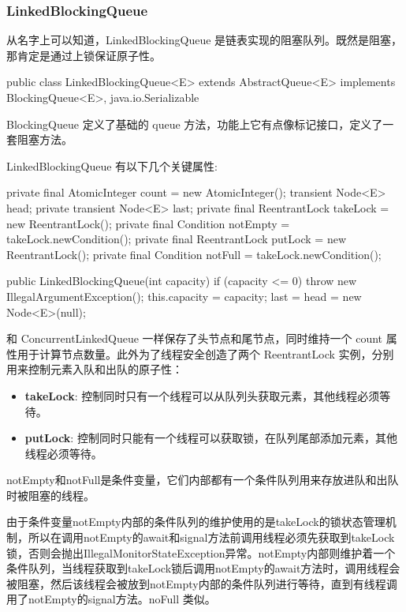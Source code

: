 \subsubsection{LinkedBlockingQueue}

从名字上可以知道，LinkedBlockingQueue 是链表实现的阻塞队列。既然是阻塞，那肯定是通过上锁保证原子性。

\begin{Java}
public class LinkedBlockingQueue<E> extends AbstractQueue<E> implements BlockingQueue<E>, java.io.Serializable
\end{Java}

BlockingQueue 定义了基础的 queue 方法，功能上它有点像标记接口，定义了一套阻塞方法。

LinkedBlockingQueue 有以下几个关键属性:

\begin{Java}
private final AtomicInteger count = new AtomicInteger();
transient Node<E> head;
private transient Node<E> last;
private final ReentrantLock takeLock = new ReentrantLock();
private final Condition notEmpty = takeLock.newCondition();
private final ReentrantLock putLock = new ReentrantLock();
private final Condition notFull = takeLock.newCondition();

public LinkedBlockingQueue(int capacity) {
    if (capacity <= 0) throw new IllegalArgumentException();
    this.capacity = capacity;
    last = head = new Node<E>(null);
}
\end{Java}

和 ConcurrentLinkedQueue 一样保存了头节点和尾节点，同时维持一个 count 属性用于计算节点数量。此外为了线程安全创造了两个 ReentrantLock 实例，分别用来控制元素入队和出队的原子性：
\begin{itemize}
    \item \textbf{takeLock}: 控制同时只有一个线程可以从队列头获取元素，其他线程必须等待。
    \item \textbf{putLock}: 控制同时只能有一个线程可以获取锁，在队列尾部添加元素，其他线程必须等待。
\end{itemize}

notEmpty和notFull是条件变量，它们内部都有一个条件队列用来存放进队和出队时被阻塞的线程。

由于条件变量notEmpty内部的条件队列的维护使用的是takeLock的锁状态管理机制，所以在调用notEmpty的await和signal方法前调用线程必须先获取到takeLock锁，否则会抛出IllegalMonitorStateException异常。notEmpty内部则维护着一个条件队列，当线程获取到takeLock锁后调用notEmpty的await方法时，调用线程会被阻塞，然后该线程会被放到notEmpty内部的条件队列进行等待，直到有线程调用了notEmpty的signal方法。noFull 类似。

